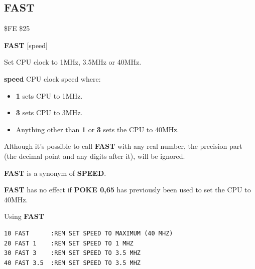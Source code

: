\subsection{FAST}
\begin{description}[leftmargin=2cm,style=nextline]
\item [Token:] \$FE \$25
\item [Format:] {\bf FAST} [speed]
\item [Usage:] Set CPU clock to 1MHz, 3.5MHz or 40MHz.

                {\bf speed} CPU clock speed where:
                \begin{itemize}
                    \item {\bf 1} sets CPU to 1MHz.
                    \item {\bf 3} sets CPU to 3MHz.
                    \item Anything other than {\bf 1} or {\bf 3} sets the CPU to 40MHz.
                \end{itemize}
\item [Remarks:] Although it's possible to call {\bf FAST}
                 with any real number, the precision part (the decimal point
                 and any digits after it), will be ignored.

                 {\bf FAST} is a synonym of {\bf SPEED}.

                 {\bf FAST} has no effect if {\bf POKE 0,65}
                 has previously been used to set the CPU to 40MHz.

\item [Example:] Using {\bf FAST}
\begin{tcolorbox}[colback=black,coltext=white]
\verbatimfont{\codefont}
\begin{verbatim}
10 FAST      :REM SET SPEED TO MAXIMUM (40 MHZ)
20 FAST 1    :REM SET SPEED TO 1 MHZ
30 FAST 3    :REM SET SPEED TO 3.5 MHZ
40 FAST 3.5  :REM SET SPEED TO 3.5 MHZ
\end{verbatim}
\end{tcolorbox}
\end{description}


\newpage
